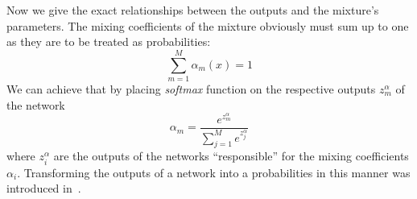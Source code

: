 \documentclass[12pt,a4paper,twoside]{scrartcl}
\numberwithin{equation}{section}
\begin{document}
Now we give the exact relationships between the outputs and the mixture's parameters. The mixing coefficients of the mixture obviously must sum up to one as they are to be treated as probabilities:
\begin{equation}
  \sum_{m=1}^M\alpha_m(x)=1
\end{equation}
We can achieve that by placing \emph{softmax} function on the respective outputs \(z_m^{\alpha} \) of the network 
\begin{equation}
  \alpha_m = \frac{e^{z_m^{\alpha}}}{\sum_{j=1}^M e^{z_j^{\alpha}}}
\end{equation}
where \(z_i^{\alpha}\) are the outputs of the networks ``responsible'' for the mixing coefficients \(\alpha_i\). Transforming the outputs of a network into a probabilities in this manner was introduced in~\cite{bridle1990}.
\end{document}
